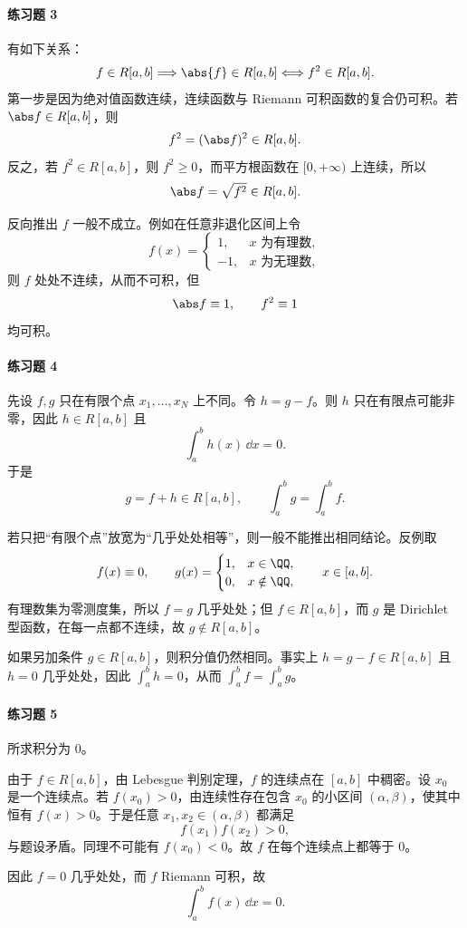 \paragraph{练习题 3}
\begin{xsolution}
有如下关系：
\[
  f\in R[a,b]\Longrightarrow \abs{f}\in R[a,b]
  \Longleftrightarrow f^2\in R[a,b].
\]
第一步是因为绝对值函数连续，连续函数与 Riemann 可积函数的复合仍可积。若 $\abs f\in R[a,b]$，则
\[
  f^2=(\abs f)^2\in R[a,b].
\]
反之，若 $f^2\in R[a,b]$，则 $f^2\geqslant0$，而平方根函数在 $[0,+\infty)$ 上连续，所以
\[
  \abs f=\sqrt{f^2}\in R[a,b].
\]

反向推出 $f$ 一般不成立。例如在任意非退化区间上令
\[
  f(x)=
  \begin{cases}
    1,&x\text{ 为有理数},\\
    -1,&x\text{ 为无理数},
  \end{cases}
\]
则 $f$ 处处不连续，从而不可积，但
\[
  \abs f\equiv1,\qquad f^2\equiv1
\]
均可积。
\end{xsolution}

\paragraph{练习题 4}
\begin{xsolution}
先设 $f,g$ 只在有限个点 $x_1,\ldots,x_N$ 上不同。令 $h=g-f$。则 $h$ 只在有限点可能非零，因此 $h\in R[a,b]$ 且
\[
  \int_a^b h(x)\,\dd x=0.
\]
于是
\[
  g=f+h\in R[a,b],
  \qquad
  \int_a^b g=\int_a^b f.
\]

若只把“有限个点”放宽为“几乎处处相等”，则一般不能推出相同结论。反例取
\[
  f(x)\equiv0,
  \qquad
  g(x)=
  \begin{cases}
    1,&x\in\QQ,\\
    0,&x\notin\QQ,
  \end{cases}
  \qquad x\in[a,b].
\]
有理数集为零测度集，所以 $f=g$ 几乎处处；但 $f\in R[a,b]$，而 $g$ 是 Dirichlet 型函数，在每一点都不连续，故 $g\notin R[a,b]$。

如果另加条件 $g\in R[a,b]$，则积分值仍然相同。事实上 $h=g-f\in R[a,b]$ 且 $h=0$ 几乎处处，因此 $\int_a^b h=0$，从而 $\int_a^b f=\int_a^b g$。
\end{xsolution}

\paragraph{练习题 5}
\begin{xsolution}
所求积分为 $0$。

由于 $f\in R[a,b]$，由 Lebesgue 判别定理，$f$ 的连续点在 $[a,b]$ 中稠密。设 $x_0$ 是一个连续点。若 $f(x_0)>0$，由连续性存在包含 $x_0$ 的小区间 $(\alpha,\beta)$，使其中恒有 $f(x)>0$。于是任意 $x_1,x_2\in(\alpha,\beta)$ 都满足
\[
  f(x_1)f(x_2)>0,
\]
与题设矛盾。同理不可能有 $f(x_0)<0$。故 $f$ 在每个连续点上都等于 $0$。

因此 $f=0$ 几乎处处，而 $f$ Riemann 可积，故
\[
  \boxed{\int_a^b f(x)\,\dd x=0}.
\]
\end{xsolution}

